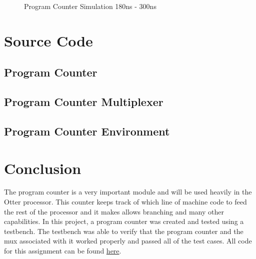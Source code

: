 \documentclass[
    a4paper, %
	12pt, %
    ]{CSSullivanBusinessReport}
\begin{document}
\begin{fullwidth}
\begin{figure}[H]
    \centering
    \captionsetup{style=widetable}
    \caption{Program Counter Simulation 180ns - 300ns}
    \label{fig:PCSimulation}
\end{figure}

\newpage
\section{Source Code}
\captionsetup{style=widetable}
\subsection{Program Counter} %



\newpage
\subsection{Program Counter Multiplexer} %



\newpage
\subsection{Program Counter Environment} %





\section {Conclusion} %
\hypersetup{urlcolor=blue} 
The program counter is a very important module and will be used heavily in the Otter processor. This counter keeps track of which line of machine code to feed the rest of the processor and it makes allows branching and many other capabilities. In this project, a program counter was created and tested using a testbench. The testbench was able to verify that the program counter and the mux associated with it worked properly and passed all of the test cases.
All code for this assignment can be found \href{https://github.com/EthanV1920/CPE-233-Otter/tree/main}{here}.


\end{fullwidth}
\end{document}
